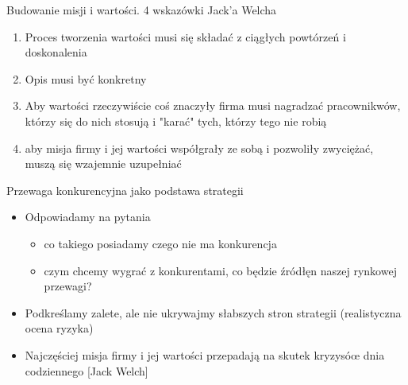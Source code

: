 \documentclass[a4paper,10pt]{report}
\begin{document}
Budowanie misji i wartości. 4 wskazówki Jack'a Welcha
\begin{enumerate}
	\item Proces tworzenia wartości musi się składać z ciągłych powtórzeń i doskonalenia
	\item Opis musi być konkretny
	\item Aby wartości rzeczywiście coś znaczyły firma musi nagradzać pracownikwów, którzy się do nich stosują i "karać" tych, którzy tego nie robią
	\item aby misja firmy i jej wartości współgrały ze sobą i pozwoliły zwyciężać, muszą się wzajemnie uzupełniać
\end{enumerate}

Przewaga konkurencyjna jako podstawa strategii
\begin{itemize}
	\item Odpowiadamy na pytania
	\begin{itemize}
		\item co takiego posiadamy czego nie ma konkurencja
		\item czym chcemy wygrać z konkurentami, co będzie źródłęn naszej rynkowej przewagi?
	\end{itemize}
	\item Podkreślamy zalete, ale nie ukrywajmy słabszych stron strategii (realistyczna ocena ryzyka)
	\item Najczęściej misja firmy i jej wartości przepadają na skutek kryzysóœ dnia codziennego [Jack Welch]
\end{itemize}
\end{document}

